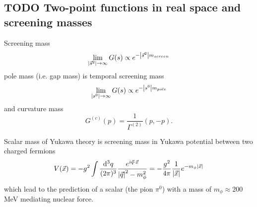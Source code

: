 \subsection{TODO Two-point functions in real space and screening masses}
\begin{mybox}{}
	Screening mass
\begin{equation}
	\lim_{\abs{\vec{s}^2}\rightarrow\infty} G(s) \propto e^{- \abs{\vec{s}^2} m_{screen}}
\end{equation}
pole mass (i.e. gap mass) is temporal screening mass
\begin{equation}
	\lim_{\abs{{s}^0} \rightarrow\infty} G(s) \propto e^{- \abs{s^0}m_{pole}}
\end{equation}
and curvature mass
\begin{equation}
G^{(c)}(p) = \frac{1}{\Gamma^{(2)}}(p,-p).
\end{equation}
\end{mybox}
Scalar mass of Yukawa theory is screening mass in Yukawa potential between two charged fermions
\begin{equation}
	V(\vec{x})= - g^2 \int \frac{\mathrm{d}^3 q}{(2 \pi)^3} \frac{e^{i\vec{q}\cdot \vec{x}}}{\abs{\vec{q}}^2-m^2_\phi} = -\frac{g^2}{4\pi} \frac{1}{\abs{\vec{x}}} e^{-m_\phi \abs{\vec{x}}}
\end{equation}
which lead to the prediction of a scalar (the pion $\pi^0$) with a mass of $m_\phi \approx 200$ MeV mediating nuclear force.




